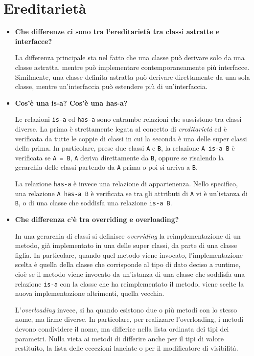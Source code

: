 \documentclass[12pt, a4paper]{article}
\begin{document}
\section{Ereditarietà}
\begin{itemize}
    \item \textbf{Che differenze ci sono tra l'ereditarietà tra classi astratte e
    interfacce?}

    La differenza principale sta nel fatto che una classe può derivare solo da una
    classe astratta, mentre può implementare contemporaneamente più interfacce.
    Similmente, una classe definita astratta può derivare direttamente da una sola
    classe, mentre un'interfaccia può estendere più di un'interfaccia.

    \item \textbf{Cos'è una is-a? Cos'è una has-a?}
    
    Le relazioni \texttt{is-a} ed \texttt{has-a} sono entrambe relazioni che sussistono
    tra classi diverse. La prima è strettamente legata al concetto di \emph{ereditarietà}
    ed è verificata da tutte le coppie di classi in cui la seconda è una delle super
    classi della prima. In particolare, prese due classi \texttt{A} e \texttt{B}, la
    relazione \texttt{A is-a B} è verificata se \texttt{A = B}, \texttt{A} deriva
    direttamente da \texttt{B}, oppure se risalendo la gerarchia delle classi
    partendo da \texttt{A} prima o poi si arriva a \texttt{B}.

    La relazione \texttt{has-a} è invece una relazione di appartenenza. Nello
    specifico, una relazione \texttt{A has-a B} è verificata se tra gli attributi
    di \texttt{A} vi è un'istanza di \texttt{B}, o di una classe che soddisfa una
    relazione \texttt{is-a B}.

    \item \textbf{Che differenza c'è tra overriding e overloading?}
    
    In una gerarchia di classi si definisce \emph{overriding} la reimplementazione
    di un metodo, già implementato in una delle super classi, da parte di una classe
    figlia. In particolare, quando quel metodo viene invocato, l'implementazione
    scelta è quella della classe che corrisponde al tipo di dato deciso a runtime, cioè
    se il metodo viene invocato da un'istanza di una classe che soddisfa una relazione
    \texttt{is-a} con la classe che ha reimplementato il metodo, viene scelte la nuova
    implementazione altrimenti, quella vecchia.

    L'\emph{overloading} invece, si ha quando esistono due o più metodi con lo stesso
    nome, ma firme diverse. In particolare, per realizzare l'overloading, i metodi devono
    condividere il nome, ma differire nella lista ordinata dei tipi dei parametri. Nulla
    vieta ai metodi di differire anche per il tipi di valore restituito, la lista delle
    eccezioni lanciate o per il modificatore di visibilità.


\end{itemize}
\end{document}
